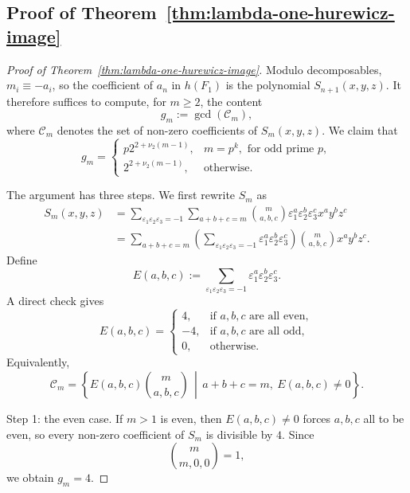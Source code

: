 \documentclass[a4paper]{amsart}
\theoremstyle{plain}
\theoremstyle{definition}
\renewcommand{\ge}{\geqslant}
\begin{document}
\subsection{Proof of Theorem~\ref{thm:lambda-one-hurewicz-image}}

\begin{proof}[Proof of Theorem~\ref{thm:lambda-one-hurewicz-image}]
	Modulo decomposables, $m_i \equiv -a_i$, so the coefficient of $a_n$ in $h(F_1)$ is the polynomial $S_{n+1}(x,y,z)$. It therefore suffices to compute, for $m\ge 2$, the content
	\[
		g_m:= \gcd(\mathcal{C}_m),
	\]
	where $\mathcal{C}_m$ denotes the set of non-zero coefficients of $S_m(x,y,z)$. We claim that
	\[
		g_m = \begin{cases}
			p 2^{2+\nu_2(m-1)} , & m = p^{k}, \text{ for odd prime }p, \\
			2^{2+\nu_2(m-1)},    & \text{otherwise.}
		\end{cases}
	\]

	The argument has three steps. We first rewrite $S_m$ as
	\[
		\begin{aligned}
			S_m(x,y,z) & = \sum_{\varepsilon_1 \varepsilon_2 \varepsilon_3 = -1} \sum_{a+b+c=m} \binom{m}{a,b,c} \varepsilon_1^a \varepsilon_2^b \varepsilon_3^c x^{a} y^{b} z^{c}               \\
			           & = \sum_{a+b+c=m} \left(\sum_{\varepsilon_1 \varepsilon_2 \varepsilon_3 = -1} \varepsilon_1^a \varepsilon_2^b \varepsilon_3^c\right) \binom{m}{a,b,c} x^{a} y^{b} z^{c}.
		\end{aligned}
	\]
	Define
	\[
		E(a,b,c) := \sum_{\varepsilon_1 \varepsilon_2 \varepsilon_3 = -1} \varepsilon_1^a \varepsilon_2^b \varepsilon_3^c.
	\]
	A direct check gives
	\[
		E(a,b,c)=
		\begin{cases}
			4,  & \text{if } a,b,c \text{ are all even}, \\
			-4, & \text{if } a,b,c \text{ are all odd},  \\
			0,  & \text{otherwise}.
		\end{cases}
	\]
	Equivalently,
	\[
		\mathcal{C}_m = \left\{ E(a,b,c)\binom{m}{a,b,c} \,\middle|\, a+b+c=m,\ E(a,b,c)\neq 0\right\}.
	\]

	Step 1: the even case. If $m>1$ is even, then $E(a,b,c)\neq 0$ forces $a,b,c$ all to be even, so every non-zero coefficient of $S_m$ is divisible by $4$. Since
	\[
		\binom{m}{m,0,0}=1,
	\]
	we obtain $g_m=4$.


\end{proof}
\end{document}
